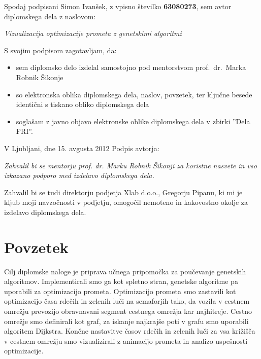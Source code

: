 \documentclass[a4paper, 12pt]{book}
\newcommand{\clearemptydoublepage}{\newpage{\pagestyle{empty}\cleardoublepage}}
\begin{document}
\vspace{1cm}
\noindent Spodaj podpisani Simon Ivan\v sek,
z vpisno \v stevilko \textbf{63080273}, sem avtor  diplomskega dela z naslovom:
   
\vspace{0.5cm}
\emph{Vizualizacija optimizacije prometa z genetskimi algoritmi}

\vspace{1.5cm}
\noindent S svojim podpisom zagotavljam, da:
\begin{itemize}
	\item sem diplomsko delo izdelal samostojno pod mentorstvom 
		prof.\ dr.\ Marka Robnik \v Sikonje

	\item	so elektronska oblika diplomskega dela, naslov, povzetek, ter klju\v cne besede identi\v cni s tiskano obliko diplomskega dela
	\item sogla\v sam z javno objavo elektronske oblike diplomskega dela v zbirki ''Dela FRI''.
\end{itemize}

\vspace{1cm}
\noindent V Ljubljani, dne 15. avgusta 2012 \hfill Podpis avtorja:

\clearemptydoublepage

\thispagestyle{empty}\mbox{}\vfill\null\it
Zahvalil bi se mentorju prof. dr. Marku Robnik \v Sikonji za koristne nasvete in vso izkazano podporo med izdelavo diplomskega dela.

Zahvalil bi se tudi direktorju podjetja Xlab d.o.o., Gregorju Pipanu,  ki mi je kljub moji navzo\v cnosti v podjetju, omogo\v cil nemoteno in kakovostno okolje za izdelavo diplomskega dela.
\rm\normalfont
 
\clearemptydoublepage

\def\thepage{}%
\tableofcontents{}


\clearemptydoublepage

\chapter*{Povzetek}
Cilj diplomske naloge je priprava u\v cnega pripomo\v cka za pou\v cevanje genetskih algoritmov. Implementirali smo ga kot spletno stran, genetske algoritme pa uporabili za optimizacijo prometa. Optimizacijo prometa smo zastavili kot optimizacijo \v casa rde\v cih in zelenih lu\v ci na semaforjih tako, da vozila v cestnem omre\v zju prevozijo obravnavani segment cestnega omre\v zja kar najhitreje. Cestno omre\v zje smo definirali kot graf, za iskanje najkraj\v se poti v grafu smo uporabili algoritem Dijkstra. Kon\v cne nastavitve \v casov rde\v cih in zelenih lu\v ci za vsa kri\v zi\v s\v ca v cestnem omre\v zju smo vizualizirali z animacijo prometa in analizo uspe\v snosti optimizacije.
\end{document}
